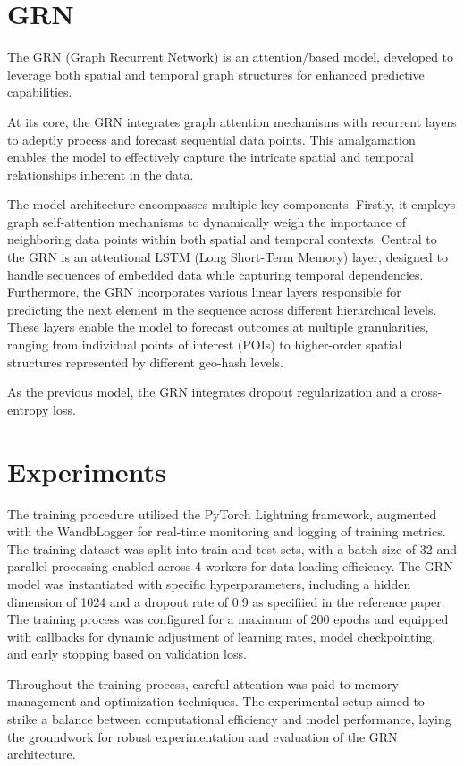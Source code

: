 \documentclass[twocolumn]{article}
\begin{document}
\section{GRN}
The GRN (Graph Recurrent Network) is an attention/based model, developed to 
leverage both spatial and temporal graph structures for enhanced predictive
 capabilities.

At its core, the GRN integrates graph attention mechanisms 
with recurrent layers to adeptly process and forecast sequential data points.
 This amalgamation enables the model to effectively capture the intricate 
 spatial and temporal relationships inherent in the data.

The model architecture encompasses multiple key components. Firstly, it employs 
graph self-attention mechanisms to dynamically weigh the importance of 
neighboring data points within both spatial and temporal contexts. 
Central to the GRN is an attentional LSTM (Long Short-Term Memory) layer, 
designed to handle sequences of embedded data while capturing temporal 
dependencies. Furthermore, the GRN incorporates various linear layers 
responsible for predicting the next element in the sequence across 
different hierarchical levels. These layers enable the model to forecast 
outcomes at multiple granularities, ranging from individual points of interest
 (POIs) to higher-order spatial structures represented by different geo-hash levels.

As the previous model, the GRN integrates dropout regularization and a
cross-entropy loss.
\section{Experiments}
The training procedure utilized the PyTorch Lightning framework, 
augmented with the WandbLogger for real-time monitoring and logging of 
training metrics. The training dataset was split into train and test sets, 
with a batch size of 32 and parallel processing enabled across 4 workers for 
data loading efficiency. The GRN model was instantiated with specific 
hyperparameters, including a hidden dimension of 1024 and a dropout rate of 0.9
as specifiied in the reference paper. The training process was configured
 for a maximum of 200 epochs and equipped with callbacks for dynamic
  adjustment of learning rates, model checkpointing, and early 
  stopping based on validation loss. 
  
  Throughout the training process, careful attention was paid to memory 
  management and optimization techniques. The experimental setup aimed to
   strike a balance between computational efficiency and model performance, 
   laying the groundwork for robust experimentation and evaluation of the
    GRN architecture.
\end{document}
